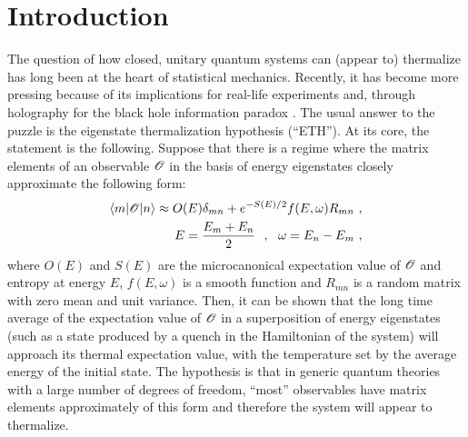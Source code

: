 \section{Introduction}
The question of how closed, unitary quantum systems can (appear to) thermalize has long been at the heart of statistical mechanics. Recently, it has become more pressing because of its implications for real-life experiments \cite{doi:10.1146/annurev-conmatphys-031214-014548,Kaufman794,PhysRevX.7.041047,PhysRevLett.123.130601,labuhn2016tunable,turner2018weak} and, through holography for the black hole information paradox \cite{Dymarsky:2016ntg,Brehm:2018ipf,Romero-Bermudez:2018dim, Hikida:2018khg,Anous:2019yku,Nayak:2019khe,besken2019quantum}. The usual answer to the puzzle is the eigenstate thermalization hypothesis (``ETH'')\cite{PhysRevA.43.2046,PhysRevE.50.888,Yukalov:2012pi,DAlessio:2016rwt}. At its core, the statement is the following. Suppose that there is a regime where the matrix elements of an observable $\mathcal{O}$ in the basis of energy eigenstates closely approximate the following form:
\begin{align}
\langle m|\mathcal{O}|n\rangle \approx O(E) \delta_{mn} + e^{-S(E)/2} f(E,\omega) R_{mn}~, \nonumber \\ 
E=\frac{E_m+E_n}{2}~~,~~\omega=E_n-E_m~, \label{eq:eth-ansatz}
\end{align}
where $O(E)$ and $S(E)$ are the microcanonical expectation value of $\mathcal{O}$ and entropy at energy $E$, $f(E,\omega)$ is a smooth function and $R_{mn}$ is a random matrix with zero mean and unit variance. Then, it can be shown that the long time average of the expectation value of $\mathcal{O}$ in a superposition of energy eigenstates (such as a state produced by a quench in the Hamiltonian of the system) will approach its thermal expectation value, with the temperature set by the average energy of the initial state. The hypothesis is that in generic quantum theories with a large number of degrees of freedom, ``most'' observables have matrix elements approximately of this form and therefore the system will appear to thermalize. 

